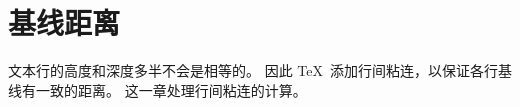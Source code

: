 \documentclass{book}
\begin{document}
\chapter{基线距离}\label{baseline}

文本行的高度和深度多半不会是相等的。
因此 \TeX\ 添加行间粘连，以保证各行基线有一致的距离。
这一章处理行间粘连的计算。
\end{document}
